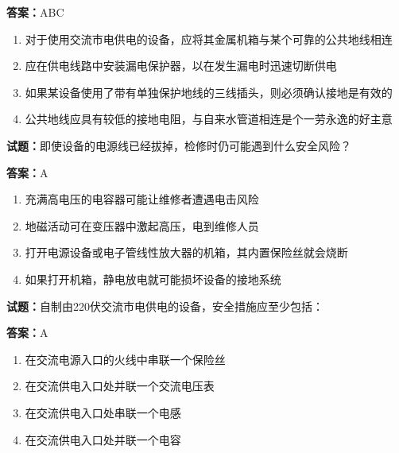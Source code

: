 \documentclass{ctexbook}
\begin{document}
\textbf{答案：}ABC 

\begin{enumerate}[leftmargin=3em]
  \item 对于使用交流市电供电的设备，应将其金属机箱与某个可靠的公共地线相连 

  \item 应在供电线路中安装漏电保护器，以在发生漏电时迅速切断供电 

  \item 如果某设备使用了带有单独保护地线的三线插头，则必须确认接地是有效的 

  \item 公共地线应具有较低的接地电阻，与自来水管道相连是个一劳永逸的好主意 

\end{enumerate}





\vspace{1em}

\textbf{试题：}即使设备的电源线已经拔掉，检修时仍可能遇到什么安全风险？ 

\textbf{答案：}A 

\begin{enumerate}[leftmargin=3em]
  \item 充满高电压的电容器可能让维修者遭遇电击风险 

  \item 地磁活动可在变压器中激起高压，电到维修人员 

  \item 打开电源设备或电子管线性放大器的机箱，其内置保险丝就会烧断 

  \item 如果打开机箱，静电放电就可能损坏设备的接地系统 

\end{enumerate}





\vspace{1em}

\textbf{试题：}自制由220伏交流市电供电的设备，安全措施应至少包括： 

\textbf{答案：}A 

\begin{enumerate}[leftmargin=3em]
  \item 在交流电源入口的火线中串联一个保险丝 

  \item 在交流供电入口处并联一个交流电压表 


  \item 在交流供电入口处串联一个电感 

  \item 在交流供电入口处并联一个电容 

\end{enumerate}
\end{document}
